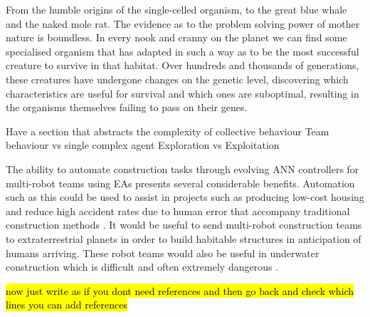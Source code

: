 From the humble origins of the single-celled organism, to the great blue whale and the naked mole rat. The evidence as to the problem solving power of mother nature is boundless. In every nook and cranny on the planet we can find some specialised organism that has adapted in such a way as to be the most successful creature to survive in that habitat. Over hundreds and thousands of generations, these creatures have undergone changes on the genetic level, discovering which characteristics are useful for survival and which ones are suboptimal, resulting in the organisms themselves failing to pass on their genes.

Have a section that abstracts the complexity of collective behaviour
Team behaviour vs single complex agent
Exploration vs Exploitation

The ability to automate construction tasks through evolving ANN controllers for multi-robot teams using EAs presents several considerable benefits. Automation such as this could be used to assist in projects such as producing low-cost housing and reduce high accident rates due to human error that accompany traditional construction methods \cite{Khoshnevis2003}. It would be useful to send multi-robot construction teams to extraterrestrial planets in order to build habitable structures in anticipation of humans arriving. These robot teams would also be useful in underwater construction which is difficult and often extremely dangerous \cite{RefWorks:30}.

\hl{now just write as if you dont need references and then go back and check which lines you can add references}



